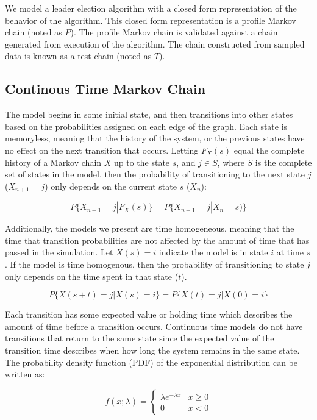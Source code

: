We model a leader election algorithm with a closed form representation of the behavior of the algorithm.
This closed form representation is a profile Markov chain (noted as $P$).
The profile Markov chain is validated against a chain generated from execution of the algorithm.
The chain constructed from sampled data is known as a test chain (noted as $T$).

\subsection{Continous Time Markov Chain}

The model begins in some initial state, and then transitions into other states based on the probabilities assigned on each edge of the graph.
Each state is memoryless, meaning that the history of the system, or the previous states have no effect on the next transition that occurs.
Letting $F_X(s)$ equal the complete history of a Markov chain $X$ up to the state $s$, and $j \in S$, where $S$ is the complete set of states in the model, then the probability of transitioning to the next state $j$ ($X_{n+1}=j$) only depends on the current state $s$ ($X_{n}$): \cite{MARKOV2} 

\begin{equation}
P\{ X_{n+1}=j | F_{X}(s) \} = P\{ X_{n+1}=j | X_{n} = s) \}
\end{equation}


Additionally, the models we present are time homogeneous, meaning that the time that transition probabilities are not affected by the amount of time that has passed in the simulation.
Let $X(s) = i$ indicate the model is in state $i$ at time $s$.
If the model is time homogenous, then the probability of transitioning to state $j$ only depends on the time spent in that state ($t$).

\begin{equation}
P\{ X(s+t)=j | X(s) = i \} = P\{ X(t)=j | X(0) = i \}
\end{equation}

Each transition has some expected value or holding time which describes the amount of time before a transition occurs.
Continuous time models do not have transitions that return to the same state since the expected value of the transition time describes when how long the system  remains in the same state.
The probability density function (PDF) of the exponential distribution can be written as: \cite{MARKOV1}

\begin{equation}
f(x;\lambda) = \begin{cases}
\lambda e^{-\lambda x} & x \ge 0 \\
0 & x < 0
\end{cases}
\end{equation}

